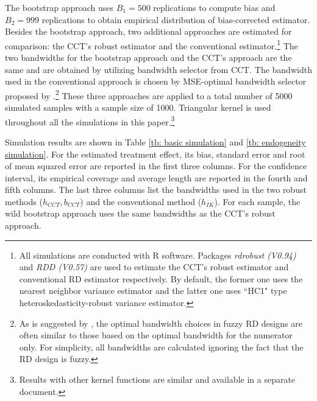 \documentclass[12pt,]{article}
\DeclareMathOperator{\1}{\mathbbm{1}}
\begin{document}
The bootstrap approach uses $B_1 = 500$ replications to compute bias and $B_2 = 999$ replications to obtain empirical distribution of bias-corrected estimator. Besides the bootstrap approach, two additional approaches are estimated for comparison: the CCT's robust estimator and the conventional estimator.\footnote{All simulations are conducted with R software. Packages \textit{rdrobust (V0.94)} and \textit{RDD (V0.57)} are used to estimate the CCT's robust estimator and conventional RD estimator respectively. By default, the former one uses the nearest neighbor variance estimator and the latter one uses ``HC1" type heteroskedasticity-robust variance estimator.} The two bandwidths for the bootstrap approach and the CCT's approach are the same and are obtained by utilizing bandwidth selector from CCT. The bandwidth used in the conventional approach is chosen by MSE-optimal bandwidth selector proposed by \cite{imbens2011optimal}.\footnote{As is suggested by \cite{imbens2011optimal}, the optimal bandwidth choices in fuzzy RD designs are often similar to those based on the optimal bandwidth for the numerator only. For simplicity, all bandwidths are calculated ignoring the fact that the RD design is fuzzy.} These three approaches are applied to a total number of 5000 simulated samples with a sample size of 1000. Triangular kernel is used throughout all the simulations in this paper.\footnote{Results with other kernel functions are similar and available in a separate document.}

Simulation results are shown in Table \ref{tb: basic simulation} and \ref{tb: endogeneity simulation}. For the estimated treatment effect, its bias, standard error and root of mean squared error are reported in the first three columns. For the confidence interval, its empirical coverage and average length are reported in the fourth and fifth columns. The last three columns list the bandwidths used in the two robust methods ($h_{CCT}, b_{CCT}$) and the conventional method ($h_{IK}$). For each sample, the wild bootstrap approach uses the same bandwidths as the CCT's robust approach.
\end{document}

